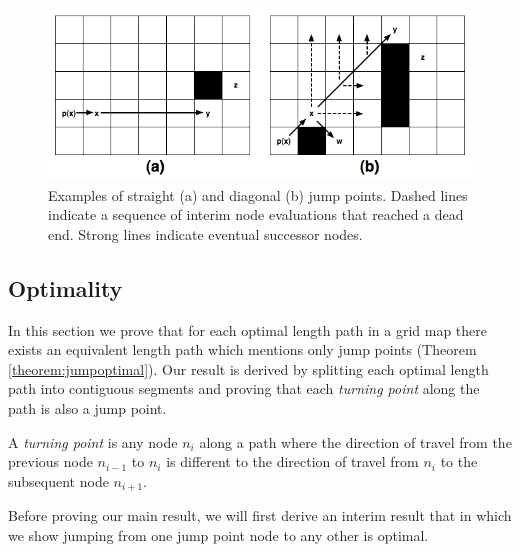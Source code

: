 \begin{figure}[tb]
       \begin{center}
		   \includegraphics[scale=0.35, trim = 10mm 10mm 10mm 0mm]
			{diagrams/jumppoints.png}
       \end{center}
	\vspace{-3pt}
       \caption{Examples of straight (a) and diagonal (b) jump points.
Dashed lines indicate a sequence of interim node evaluations that reached
a dead end. Strong lines indicate eventual successor nodes.}
       \label{fig:jumppoints}
\end{figure}

\subsection{Optimality}
In this section we prove that for each optimal length path in a grid map there
exists an equivalent length path which mentions only jump points (Theorem
\ref{theorem:jumpoptimal}).  Our result is derived by splitting each optimal 
length path into contiguous segments and proving that each \emph{turning point}
along the path is also a jump point.

\begin{definition}
\label{def:turningpoint}
A \emph{turning point} is any node $n_{i}$ along a path where the direction of
travel from the previous node $n_{i-1}$ to $n_{i}$ is different to the direction
of travel from $n_{i}$ to the subsequent node $n_{i+1}$.
\end{definition}

Before proving our main result, we will first derive an interim result that
in which we show jumping from one jump point node to any other is optimal.

